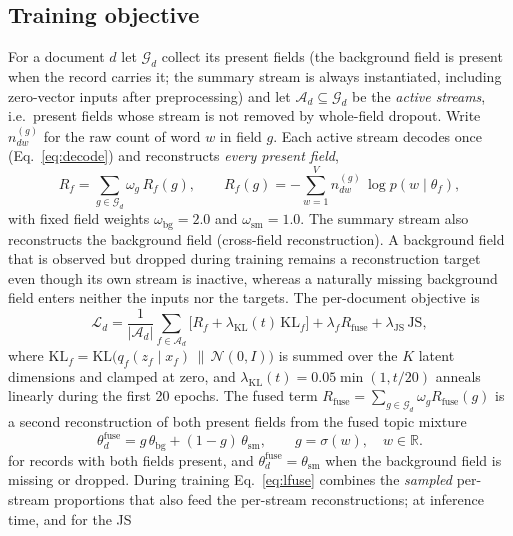\documentclass[pdflatex,sn-basic]{sn-jnl}
\begin{document}
\subsection{Training objective}
For a document $d$ let $\mathcal{G}_d$ collect its present fields (the background field is present
when the record carries it; the summary stream is always instantiated, including zero-vector
inputs after preprocessing) and let
$\mathcal{A}_d\subseteq\mathcal{G}_d$ be the \emph{active streams}, i.e.\ present fields whose
stream is not removed by whole-field dropout. Write $n^{(g)}_{dw}$ for the raw count of word $w$
in field $g$. Each active stream decodes once (Eq.~\eqref{eq:decode}) and reconstructs
\emph{every present field},
\begin{equation}
R_f=\sum_{g\in\mathcal{G}_d}\omega_g\,R_f(g),\qquad
R_f(g)=-\sum_{w=1}^{V} n^{(g)}_{dw}\,\log p\!\left(w\mid\theta_f\right),
\label{eq:recon}
\end{equation}
with fixed field weights $\omega_{\mathrm{bg}}=2.0$ and $\omega_{\mathrm{sm}}=1.0$. The summary
stream also reconstructs the background field (cross-field reconstruction). A background field
that is observed but dropped during training remains a reconstruction target even though its own
stream is inactive, whereas a naturally missing background field enters neither the inputs nor the
targets. The per-document objective is
\begin{equation}
\mathcal{L}_d=\frac{1}{|\mathcal{A}_d|}\sum_{f\in\mathcal{A}_d}
\Big[R_f+\lambda_{\mathrm{KL}}(t)\,\mathrm{KL}_f\Big]
+\lambda_f R_{\mathrm{fuse}}+\lambda_{\mathrm{JS}}\,\mathrm{JS},
\label{eq:total}
\end{equation}
where $\mathrm{KL}_f=\mathrm{KL}\big(q_f(z_f\mid x_f)\,\|\,\mathcal N(0,I)\big)$ is summed over
the $K$ latent dimensions and clamped at zero, and $\lambda_{\mathrm{KL}}(t)=0.05\min(1,t/20)$
anneals linearly during the first 20 epochs. The fused term
$R_{\mathrm{fuse}}=\sum_{g\in\mathcal{G}_d}\omega_g R_{\mathrm{fuse}}(g)$ is a second
reconstruction of both present fields from the fused topic mixture
\begin{equation}
\theta_d^{\mathrm{fuse}}=g\,\theta_{\mathrm{bg}}+(1-g)\,\theta_{\mathrm{sm}},
\qquad g=\sigma(w),\quad w\in\mathbb{R}.
\label{eq:lfuse}
\end{equation}
for records with both fields present, and
$\theta_d^{\mathrm{fuse}}=\theta_{\mathrm{sm}}$ when the background field is missing or
dropped. During training Eq.~\eqref{eq:lfuse} combines the \emph{sampled} per-stream
proportions that also feed the per-stream reconstructions; at inference time, and for the JS
\end{document}

